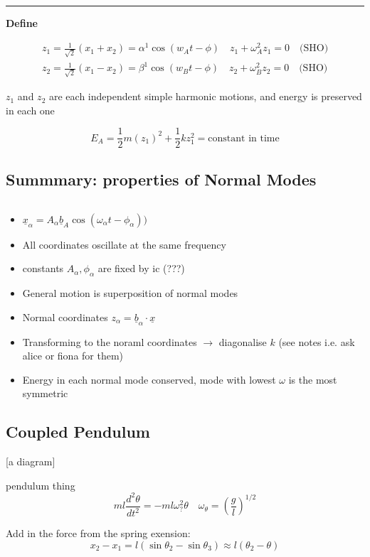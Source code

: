 \documentclass{article}
\begin{document}
\noindent\rule{\textwidth}{0.2pt}

\textbf{Define}

\begin{align*}
    z_{1} = \frac{1}{\sqrt{2}}(x_{1} + x_{2}) = \alpha^{1}\cos(w_{A}t - \phi) \quad z_{1}+\omega^{2}_{A} z_{1} = 0 \quad\text{(SHO)} \\
    z_{2} = \frac{1}{\sqrt{2}}(x_{1} - x_{2}) = \beta^{1}\cos(w_{B}t - \phi) \quad z_{2}+\omega^{2}_{B} z_{2} = 0\quad\text{(SHO)}
\end{align*}

$z_{1}$ and $z_{2}$ are each independent simple harmonic motions, and energy is preserved in each one

\[E_{A} = \frac{1}{2} m (z_{1})^{2} + \frac{1}{2} k z^{2}_{1} = \text{constant in time}\]

\subsection{Summmary: properties of Normal Modes}
\[\]
\begin{itemize}
    \item $\underline{x}_{\alpha} = A_{\alpha} \underline{b}_{A} \cos(\omega_{\alpha} t - \phi_{\alpha}))$
    \item All coordinates oscillate at the same frequency
    \item constants $A_{\alpha}, \phi_{\alpha}$ are fixed by  ic (???)
    \item General motion is superposition of normal modes
    \item Normal coordinates $z_{\alpha} = \underline{b}_{\alpha} \cdot \underline{x}$
    \item Transforming to the noraml coordinates $\to$ diagonalise $k$ (see notes i.e. ask alice or fiona for them)
    \item Energy in each normal mode conserved, mode with lowest $\omega$ is the most symmetric
\end{itemize}

\newpage
\subsection{Coupled Pendulum}
[a diagram]

pendulum thing
\[ml \frac{d^{2}\theta}{dt^{2}} = -ml \omega^{2}_{?} \theta\quad \omega_{\theta} = \left(\frac{g}{l}\right)^{1/2}\]

Add in the force from the spring exension:
\[x_{2} - x_{1} = l(\sin\theta_{2} - \sin\theta_{3}) \approx l(\theta_{2} - \theta)\]
\end{document}

